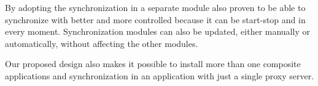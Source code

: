 \documentclass[conference]{IEEEtran}
\begin{document}
By adopting the synchronization in a separate module also proven to be able to synchronize with better and more controlled because it can be start-stop and in every moment. Synchronization modules can also be updated, either manually or automatically, without affecting the other modules.

Our proposed design also makes it possible to install more than one composite applications and synchronization in an application with just a single proxy server.













%







\end{document}
